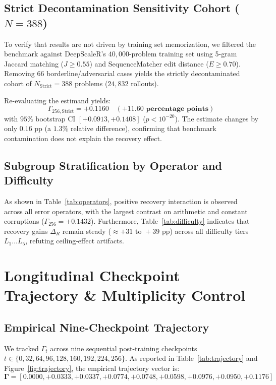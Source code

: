 \documentclass[11pt]{article}
\begin{document}
\subsection{Strict Decontamination Sensitivity Cohort \texorpdfstring{($N=388$)}{(N=388)}}
To verify that results are not driven by training set memorization, we filtered the benchmark against DeepScaleR's $40,000$-problem training set using 5-gram Jaccard matching ($J \ge 0.55$) and SequenceMatcher edit distance ($E \ge 0.70$). Removing 66 borderline/adversarial cases yields the strictly decontaminated cohort of $N_{\text{Strict}} = 388$ problems ($24,832$ rollouts).

Re-evaluating the estimand yields:
\begin{equation}
\Gamma_{256,\text{Strict}} = \mathbf{+0.1160} \quad (\mathbf{+11.60\text{ percentage points}})
\end{equation}
with $95\%$ bootstrap CI $[+0.0913, +0.1408]$ ($p < 10^{-20}$). The estimate changes by only $0.16\text{ pp}$ (a $1.3\%$ relative difference), confirming that benchmark contamination does not explain the recovery effect.

\subsection{Subgroup Stratification by Operator and Difficulty}
As shown in Table~\ref{tab:operators}, positive recovery interaction is observed across all error operators, with the largest contrast on arithmetic and constant corruptions ($\Gamma_{256} = +0.1432$). Furthermore, Table~\ref{tab:difficulty} indicates that recovery gains $\Delta_R$ remain steady ($\approx +31\text{ to }+39\text{ pp}$) across all difficulty tiers $L_1 \dots L_5$, refuting ceiling-effect artifacts.




\section{Longitudinal Checkpoint Trajectory \& Multiplicity Control}

\subsection{Empirical Nine-Checkpoint Trajectory}
We tracked $\Gamma_t$ across nine sequential post-training checkpoints $t \in \{0, 32, 64, 96, 128, 160, 192, 224, 256\}$. As reported in Table~\ref{tab:trajectory} and Figure~\ref{fig:trajectory}, the empirical trajectory vector is:
\begin{equation}
\mathbf{\Gamma} = [0.0000, +0.0333, +0.0337, +0.0774, +0.0748, +0.0598, +0.0976, +0.0950, +0.1176]
\end{equation}
\end{document}
